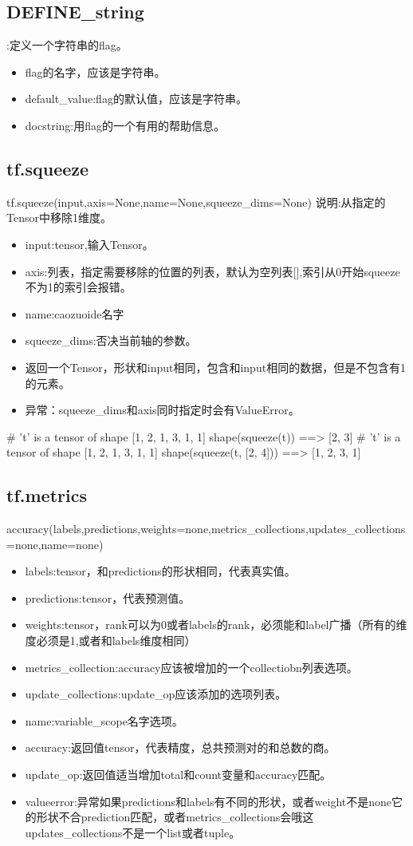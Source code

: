 \subsection{DEFINE\_string}:定义一个字符串的flag。
\begin{itemize}
\item flag的名字，应该是字符串。
\item default\_value:flag的默认值，应该是字符串。
\item docstring:用flag的一个有用的帮助信息。
\end{itemize}
\subsection{tf.squeeze}
tf.squeeze(input,axis=None,name=None,squeeze\_dims=None)
说明:从指定的Tensor中移除1维度。
\begin{itemize}
\item input:tensor,输入Tensor。
\item axis:列表，指定需要移除的位置的列表，默认为空列表[],索引从0开始squeeze不为1的索引会报错。
\item name:caozuoide名字
\item squeeze\_dims:否决当前轴的参数。
\item 返回一个Tensor，形状和input相同，包含和input相同的数据，但是不包含有1的元素。
\item 异常：squeeze\_dims和axis同时指定时会有ValueError。
\end{itemize}
\# 't' is a tensor of shape [1, 2, 1, 3, 1, 1]\newline
shape(squeeze(t)) ==> [2, 3]\newline
\# 't' is a tensor of shape [1, 2, 1, 3, 1, 1]\newline
shape(squeeze(t, [2, 4])) ==> [1, 2, 3, 1]\newline
\subsection{tf.metrics}
accuracy(labels,predictions,weights=none,metrics\_collections,updates\_collections=none,name=none)
\begin{itemize}
	\item labels:tensor，和predictions的形状相同，代表真实值。
	\item predictions:tensor，代表预测值。
	\item weights:tensor，rank可以为0或者labels的rank，必须能和label广播（所有的维度必须是1,或者和labels维度相同）
	\item metrics\_collection:accuracy应该被增加的一个collectiobn列表选项。
	\item update\_collections:update\_op应该添加的选项列表。
	\item name:variable\_scope名字选项。
	\item accuracy:返回值tensor，代表精度，总共预测对的和总数的商。
	\item update\_op:返回值适当增加total和count变量和accuracy匹配。
	\item valueerror:异常如果predictions和labels有不同的形状，或者weight不是none它的形状不合prediction匹配，或者metrics\_collections会哦这updates\_collections不是一个list或者tuple。
\end{itemize}

